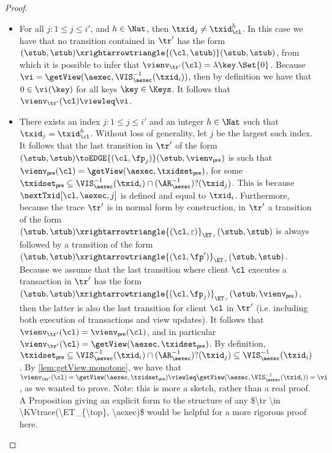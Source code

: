 \begin{proof}
\begin{itemize}
\begin{enumerate}
\begin{itemize}
\item For all $j : 1 \leq j \leq i'$, and $h \in \Nat$, then $\txid_{j} \neq \txid_{\cl}^{h}$.
In this case we have that no transition contained in $\tr'$ has the form 
$(\stub, \stub) \xrightarrowtriangle{(\cl, \stub)} (\stub, \stub)$, from which it is possible to infer 
that  $\vienv_{\tr'}(\cl) = \lambda \key. \Set{0}$. Because $\vi = \getView(\aexec, \VIS^{-1}_{\aexec}(\txid_{i}))$, 
then by definition we have that $0 \in \vi(\key)$ for all keys $\key \in \Keys$. It follows that 
$\vienv_{\tr'}(\cl) \viewleq \vi$. 

\item There exists an index $j : 1 \leq j \leq i'$ and an integer $h \in \Nat$ such that $\txid_{j} = \txid_{\cl}^{h}$. 
Without loss of generality, let $j$ be the largest such index. 
It follows that the last transition in $\tr'$ of the form $(\stub, \stub) \toEDGE{(\cl, \fp_{j})} (\stub, \vienv_{\mathsf{pre}})$ 
is such that $\vienv_{\mathsf{pre}}(\cl) = \getView(\aexec, \txidset_{\mathsf{pre}})$, 
for some $\txidset_{\mathsf{pre}} \subseteq \VIS^{-1}_{\aexec}(\txid_{i}) \cap (\AR^{-1}_{\aexec})?(\txid_{j})$.
This is because $\nextTxid[\cl, \aexec, j]$  is defined and equal to $\txid_{i}$. 
Furthermore, because the trace $\tr'$ is in normal form by construction, 
in $\tr'$ a transition of the form $(\stub, \stub) \xrightarrowtriangle{(\cl, \varepsilon)}_{\ET_{\top}} (\stub, \stub)$ 
is always followed by a transition of the form $(\stub, \stub) \xrightarrowtriangle{(\cl, \fp')}_{\ET_{\top}} (\stub, \stub)$. 
Because we assume that the last transition where client $\cl$ executes a transaction in $\tr'$ 
has the form $(\stub, \stub) \xrightarrowtriangle{(\cl, \fp_{j})}_{\ET_{\top}} (\stub, \vienv_{\mathsf{pre}})$, 
then the latter is also the last transition for client $\cl$ in $\tr'$ 
(i.e. including both execution of transactions and view updates). 
It follows that $\vienv_{\tr'}(\cl) = \vienv_{\mathsf{pre}}(\cl)$, and in particular 
$\vienv_{\tr'}(\cl) = \getView(\aexec, \txidset_{\mathsf{pre}})$. By definition, 
$\txidset_{\mathsf{pre}} \subseteq  \VIS^{-1}_{\aexec}(\txid_{i}) \cap (\AR^{-1}_{\aexec})?(\txid_{j}) 
\subseteq \VIS^{-1}_{\aexec}(\txid_{i})$. By  \cref{lem:getView.monotone}, 
we have that $\vienv_{\tr'}(\cl) = \getView(\aexec, \txidset_{\mathsf{pre}}) \viewleq 
\getView(\aexec, \VIS^{-1}_{\aexec}(\txid_{i})) = \vi$, as we wanted to prove.
\ac{Note: this is more a sketch, rather than a real proof. A Proposition giving an explicit form to the 
structure of any $\tr \in \KVtrace(\ET_{\top}, \aexec)$ would be helpful for a more rigorous proof here.}
\end{itemize}



\end{enumerate}
\end{itemize}
\end{proof}
